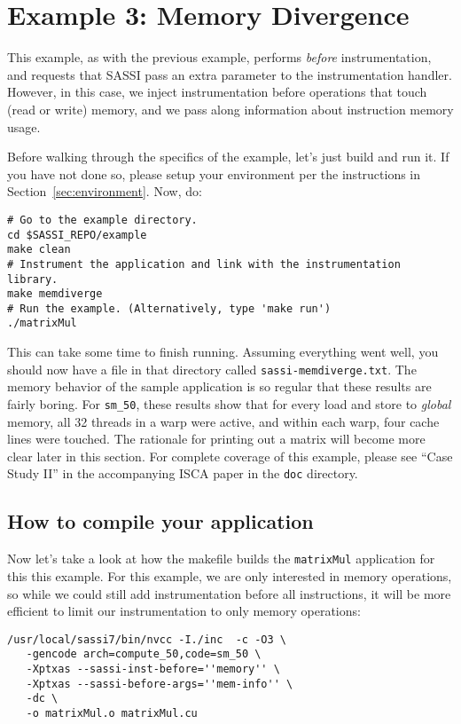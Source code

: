 \pagebreak
\section{Example 3: Memory Divergence}
\label{sec:example3}

This example, as with the previous example, performs \emph{before}
instrumentation, and requests that SASSI pass an extra parameter to
the instrumentation handler.  However, in this case, we inject
instrumentation before operations that touch (read or write) memory,
and we pass along information about instruction memory usage.

Before walking through the specifics of the example, let's just build
and run it. If you have not done so, please setup your environment
per the instructions in Section~\ref{sec:environment}.  Now, do:
\begin{lstlisting}[style=BashInputStyle]
# Go to the example directory.
cd $SASSI_REPO/example
make clean
# Instrument the application and link with the instrumentation library.
make memdiverge
# Run the example. (Alternatively, type 'make run')
./matrixMul
\end{lstlisting}

This can take some time to finish running.  Assuming everything went
well, you should now have a file in that directory called
\texttt{sassi-memdiverge.txt}.  The memory behavior of the sample
application is so regular that these results are fairly boring.  For
\texttt{sm\_50}, these results show that for every load and store to
\emph{global} memory, all 32 threads in a warp were active, and within
each warp, four cache lines were touched.  The rationale for printing
out a matrix will become more clear later in this section.  For
complete coverage of this example, please see ``Case Study II'' in the
accompanying ISCA paper in the \texttt{doc} directory.

\subsection{How to compile your application}

Now let's take a look at how the makefile builds the
\texttt{matrixMul} application for this this example.  For this
example, we are only interested in memory operations, so while we
could still add instrumentation before all instructions, it will be
more efficient to limit our instrumentation to only memory operations:
\begin{lstlisting}[style=BashInputStyle]
/usr/local/sassi7/bin/nvcc -I./inc  -c -O3 \
   -gencode arch=compute_50,code=sm_50 \
   -Xptxas --sassi-inst-before=''memory'' \
   -Xptxas --sassi-before-args=''mem-info'' \
   -dc \
   -o matrixMul.o matrixMul.cu
\end{lstlisting}

